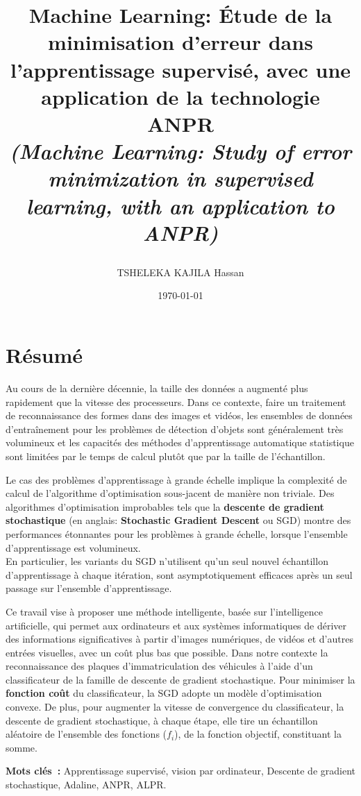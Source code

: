 \documentclass[12pt,a4paper]{article}
\title{\Large{{\bf{Machine Learning: Étude de la minimisation d'erreur dans l'apprentissage supervisé, avec une application de la technologie ANPR}}\\
\small{\textit{(Machine Learning: Study of error minimization in supervised learning, with an application to ANPR)}}

}
}
\author{TSHELEKA KAJILA Hassan}
\date{\today}
\begin{document}
	
	\maketitle
	
	\section*{Résumé} 
	
	Au cours de la dernière décennie, la taille des données a augmenté plus rapidement que la vitesse des processeurs. Dans ce contexte, faire un traitement de {reconnaissance} des formes dans des images et vidéos, les ensembles de données d'entraînement pour les problèmes de détection d'objets sont généralement très volumineux et les capacités des méthodes d'apprentissage automatique statistique sont limitées par le temps de calcul plutôt que par la taille de l'échantillon. 
	
	Le cas des problèmes d'apprentissage à grande échelle implique la complexité de calcul de l'algorithme d'optimisation sous-jacent de manière non triviale. Des algorithmes d'optimisation improbables tels que la \textbf{descente de gradient stochastique} (en anglais: \textbf{Stochastic Gradient Descent} ou SGD) montre des performances étonnantes pour les problèmes à grande échelle, lorsque l'ensemble d'apprentissage est volumineux. \\
	En particulier, les variants du SGD n'utilisent qu'un seul nouvel échantillon d'apprentissage à chaque itération, sont asymptotiquement efficaces après un seul passage sur l'ensemble d'apprentissage.	
	
	Ce travail vise à proposer une méthode  intelligente, basée sur l'intelligence artificielle, qui permet aux ordinateurs et aux systèmes informatiques de dériver des informations significatives à partir d'images numériques, de vidéos et d'autres entrées visuelles, avec un coût plus bas que possible. Dans notre contexte la reconnaissance des plaques d’immatriculation des véhicules à l'aide d’un classificateur de la famille de descente de gradient stochastique. Pour minimiser la \textbf{fonction coût} du classificateur, la SGD adopte un modèle d'optimisation convexe. De plus, pour augmenter la vitesse de convergence du classificateur, la descente de gradient stochastique, à chaque étape, elle tire un échantillon aléatoire de l'ensemble des fonctions ($f_i$), de la fonction objectif, constituant la somme.
	

	
	\vspace{1 cm}
		
	\textbf{Mots clés~:} Apprentissage supervisé, vision par ordinateur, Descente de gradient stochastique, Adaline, ANPR, ALPR. 
	
	\nocite{*}
	
	
	
	
	
	
\end{document}
